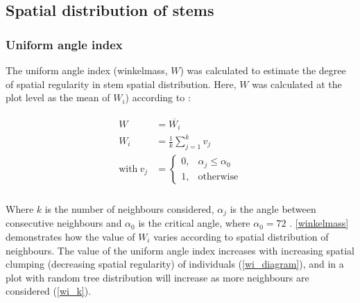 \documentclass[11pt,a4paper]{article}
\begin{document}
\subsection{Spatial distribution of stems}

\subsubsection{Uniform angle index}

The uniform angle index (winkelmass, $W$) was calculated to estimate the degree of spatial regularity in stem spatial distribution. Here, $W$ was calculated at the plot level as the mean of $W_{i}$) according to \citet{Gadow2002}: 

\begin{align}
\begin{split}
	W &= \overline{W_{i}} \\
	W_{i} &= \frac{1}{k} \sum_{j=1}^{k} v_{j} \\
	\text{with}\ v_{j} &= \begin{cases}
		0,& \alpha_{j} \le \alpha_{0} \\
		1,& \text{otherwise}
	\end{cases} \\
\end{split}
\end{align}

Where $k$ is the number of neighbours considered, $\alpha_{j}$ is the angle between consecutive neighbours and $\alpha_{0}$ is the critical angle, where $\alpha_{0} = 72$\textdegree{} \citep{Hui2002}. \autoref{winkelmass} demonstrates how the value of $W_{i}$ varies according to spatial distribution of neighbours. The value of the uniform angle index increases with increasing spatial clumping (decreasing spatial regularity) of individuals (\autoref{wi_diagram}), and in a plot with random tree distribution will increase as more neighbours are considered (\autoref{wi_k}). 
\end{document}
